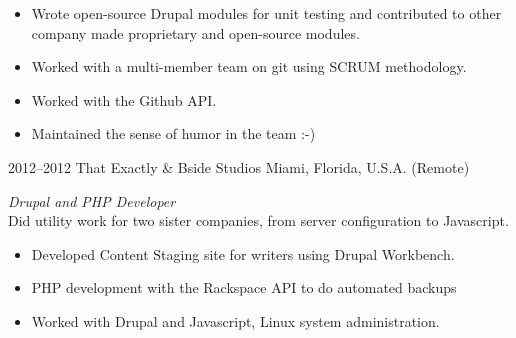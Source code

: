 \documentclass[]{friggeri-cv} %
\begin{document}
\begin{entrylist}
{\begin{itemize}
\item Wrote open-source Drupal modules for unit testing and contributed to other company made proprietary and open-source modules.
\item Worked with a multi-member team on git using SCRUM methodology.
\item Worked with the Github API.
\item Maintained the sense of humor in the team :-)
\end{itemize}}
\entry
{2012--2012}
{That Exactly \& Bside Studios}
{Miami, Florida, U.S.A. (Remote)}
{\emph{Drupal and PHP Developer} \\
Did utility work for two sister companies, from server configuration to Javascript.
\begin{itemize}
\item Developed Content Staging site for writers using Drupal Workbench.
\item PHP development with the Rackspace API to do automated backups
\item Worked with Drupal and Javascript, Linux system administration.
\end{itemize}}
 \end{entrylist}
\end{document}

